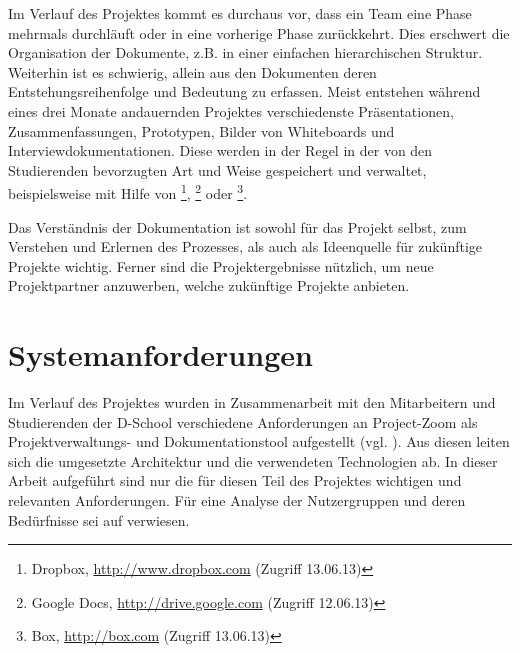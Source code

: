 Im Verlauf des Projektes kommt es durchaus vor, dass ein Team eine Phase mehrmals durchläuft oder in eine vorherige Phase zurückkehrt. Dies erschwert die Organisation der Dokumente, z.B. in einer einfachen hierarchischen Struktur. Weiterhin ist es schwierig, allein aus den Dokumenten deren Entstehungsreihenfolge und Bedeutung zu erfassen. Meist entstehen während eines drei Monate andauernden Projektes verschiedenste Präsentationen, Zusammenfassungen, Prototypen, Bilder von Whiteboards und Interviewdokumentationen. Diese werden in der Regel in der von den Studierenden bevorzugten Art und Weise gespeichert und verwaltet, beispielsweise mit Hilfe von \footnote{Dropbox, \url{http://www.dropbox.com} (Zugriff 13.06.13)}, \footnote{Google Docs, \url{http://drive.google.com} (Zugriff 12.06.13)} oder \footnote{Box, \url{http://box.com} (Zugriff 13.06.13)}.

Das Verständnis der Dokumentation ist sowohl für das Projekt selbst, zum Verstehen und Erlernen des Prozesses, als auch als Ideenquelle für zukünftige Projekte wichtig. Ferner sind die Projektergebnisse nützlich, um neue Projektpartner anzuwerben, welche zukünftige Projekte anbieten. 

\section{Systemanforderungen}
\label{sec:requirements}

Im Verlauf des Projektes wurden in Zusammenarbeit mit den Mitarbeitern und Studierenden der D-School verschiedene Anforderungen an Project-Zoom als Projektverwaltungs- und Dokumentationstool aufgestellt (vgl. \cite{requirements}).  Aus diesen leiten sich die umgesetzte Architektur und die verwendeten Technologien ab. In dieser Arbeit aufgeführt sind nur die für diesen Teil des Projektes wichtigen und relevanten Anforderungen. Für eine Analyse der Nutzergruppen und deren Bedürfnisse sei auf \cite{requirements}  verwiesen.

